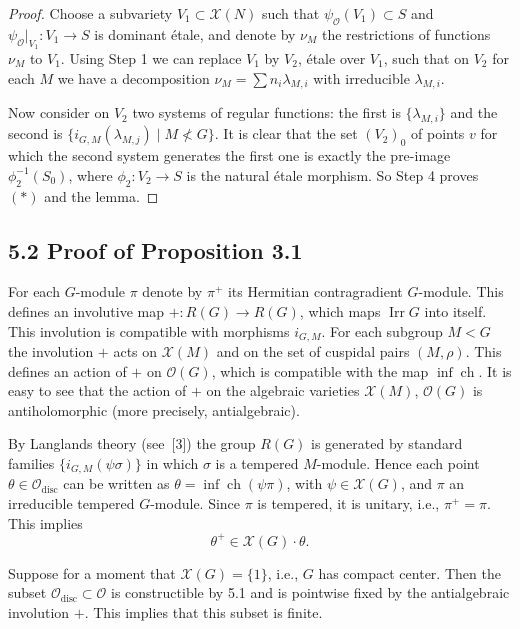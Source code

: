 \documentclass[12pt,a4paper]{article}
\theoremstyle{plain}
\theoremstyle{definition}
\theoremstyle{remark}
\DeclareMathOperator{\Irr}{Irr}
\DeclareMathOperator{\ch}{ch}
\DeclareMathOperator{\disc}{disc}
\newcommand{\cO}{\mathcal{O}}
\newcommand{\cX}{\mathcal{X}}
\begin{document}
\begin{proof}
Choose a subvariety $V_1 \subset \cX(N)$ such that $\psi_{\cO}(V_1) \subset S$ and $\psi_{\cO}|_{V_1}: V_1 \to S$ is dominant \'etale, and denote by $\nu_M$ the restrictions of functions $\nu_M$ to $V_1$. Using Step 1 we can replace $V_1$ by $V_2$, \'etale over $V_1$, such that on $V_2$ for each $M$ we have a decomposition $\nu_M = \sum n_i \lambda_{M,i}$ with irreducible $\lambda_{M,i}$.

Now consider on $V_2$ two systems of regular functions: the first is $\{\lambda_{M,i}\}$ and the second is $\{i_{G,M}(\lambda_{M,j}) \mid M \not< G\}$. It is clear that the set $(V_2)_0$ of points $v$ for which the second system generates the first one is exactly the pre-image $\phi_2^{-1}(S_0)$, where $\phi_2: V_2 \to S$ is the natural \'etale morphism. So Step 4 proves $(*)$ and the lemma.
\end{proof}

\subsection*{5.2 Proof of Proposition 3.1}

For each $G$-module $\pi$ denote by $\pi^+$ its Hermitian contragradient $G$-module. This defines an involutive map $+: R(G) \to R(G)$, which maps $\Irr G$ into itself. This involution is compatible with morphisms $i_{G,M}$. For each subgroup $M < G$ the involution $+$ acts on $\cX(M)$ and on the set of cuspidal pairs $(M, \rho)$. This defines an action of $+$ on $\cO(G)$, which is compatible with the map $\inf\ch$. It is easy to see that the action of $+$ on the algebraic varieties $\cX(M)$, $\cO(G)$ is antiholomorphic (more precisely, antialgebraic).

By Langlands theory (see~[3]) the group $R(G)$ is generated by standard families $\{i_{G,M}(\psi\sigma)\}$ in which $\sigma$ is a tempered $M$-module. Hence each point $\theta \in \cO_{\disc}$ can be written as $\theta = \inf\ch(\psi\pi)$, with $\psi \in \cX(G)$, and $\pi$ an irreducible tempered $G$-module. Since $\pi$ is tempered, it is unitary, i.e., $\pi^+ = \pi$. This implies
\begin{equation}\label{eq:plus}
\theta^+ \in \cX(G) \cdot \theta. \tag{+}
\end{equation}

Suppose for a moment that $\cX(G) = \{1\}$, i.e., $G$ has compact center. Then the subset $\cO_{\disc} \subset \cO$ is constructible by 5.1 and is pointwise fixed by the antialgebraic involution $+$. This implies that this subset is finite.
\end{document}
